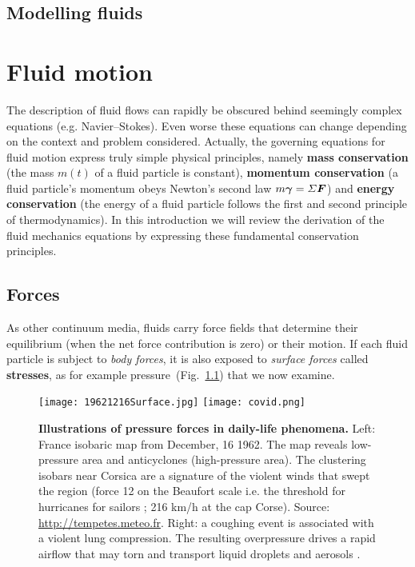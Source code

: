 \newpage
\section*{Modelling fluids}
\chapter{Fluid motion}

The description of fluid flows can rapidly be obscured behind seemingly complex equations (e.g. Navier--Stokes). Even worse these equations can change depending on the context and problem considered. Actually, the governing equations for fluid motion express truly simple physical principles, namely \textbf{mass conservation} (the mass $m(t)$ of a fluid particle is constant), \textbf{momentum conservation} (a fluid particle's momentum obeys Newton's second law $m \matrixsym \gamma = \Sigma \bF$) and \textbf{energy conservation} (the energy of a fluid particle follows the first and second principle of thermodynamics).  In this introduction we will review the derivation of the fluid mechanics equations by expressing these fundamental conservation principles.
\section{Forces}
As other continuum media, fluids carry force fields that determine their equilibrium (when the net force contribution is zero) or their motion. If each fluid particle is subject to \textit{body forces}, it is also exposed to \textit{surface forces} called \textbf{stresses}, as for example pressure~(Fig.~\ref{fig:weather_map}) that we now examine.
\begin{figure}[htbp]
\begin{center}
\texttt{[image: 19621216Surface.jpg]}
\texttt{[image: covid.png]} %
\caption{\textbf{Illustrations of pressure forces in daily-life phenomena.} Left: France isobaric map from December, 16 1962. The map reveals low-pressure area and anticyclones (high-pressure area). The clustering isobars near Corsica are a signature of the violent winds that swept the region (force 12 on the Beaufort scale i.e. the threshold for hurricanes for sailors ; 216 km/h at the cap Corse). Source: \url{http://tempetes.meteo.fr}. Right: a coughing event is associated with a violent lung compression. The resulting overpressure drives a rapid airflow that may torn and transport liquid droplets and aerosols \citep{Mittal2020}.}
\label{fig:weather_map}
\end{center}
\end{figure}

